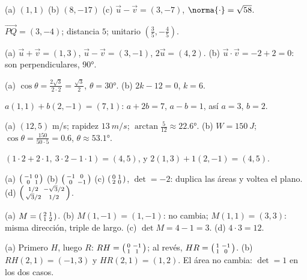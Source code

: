 \documentclass[11pt,a4paper]{article}
\newcommand{\matdos}[4]{\mathchoice{\begin{pmatrix}#1 & #2\\ #3 & #4\end{pmatrix}}{\left(\begin{smallmatrix}#1 & #2\\ #3 & #4\end{smallmatrix}\right)}{\left(\begin{smallmatrix}#1 & #2\\ #3 & #4\end{smallmatrix}\right)}{\left(\begin{smallmatrix}#1 & #2\\ #3 & #4\end{smallmatrix}\right)}}
\begin{document}
\respuestas
\begin{respuestascortas}
\begin{soluciones}
\item (a) $(1,1)$ (b) $(8,-17)$ (c) $\vec u-\vec v=(3,-7)$, $\norma{\cdot}=\sqrt{58}$.
\item $\overrightarrow{PQ}=(3,-4)$; distancia $5$; unitario $\left(\frac35,-\frac45\right)$.
\item (a) $\vec u+\vec v=(1,3)$, $\vec u-\vec v=(3,-1)$, $2\vec u=(4,2)$. (b) $\vec u\cdot\vec v=-2+2=0$: son
  perpendiculares, \ang{90}.
\item (a) $\cos\theta=\frac{2\sqrt3}{2\cdot2}=\frac{\sqrt3}{2}$, $\theta=\ang{30}$. (b) $2k-12=0$, $k=6$.
\item $a(1,1)+b(2,-1)=(7,1)$: $a+2b=7$, $a-b=1$, así $a=3$, $b=2$.
\item (a) $(12,5)$ \si{m/s}; rapidez $\SI{13}{m/s}$; $\arctan\frac{5}{12}\approx\ang{22.6}$.
  (b) $W=\SI{150}{J}$; $\cos\theta=\frac{150}{50\cdot5}=0.6$, $\theta\approx\ang{53.1}$.
\item $(1\cdot2+2\cdot1,\ 3\cdot2-1\cdot1)=(4,5)$, y $2(1,3)+1(2,-1)=(4,5)$.
\item (a) $\matdos{-1}001$ (b) $\matdos{-1}00{-1}$ (c) $\matdos0120$, $\det=-2$: duplica las áreas y voltea el plano.
  (d) $\matdos{1/2}{-\sqrt3/2}{\sqrt3/2}{1/2}$.
\item (a) $M=\matdos2112$. (b) $M(1,-1)=(1,-1)$: no cambia; $M(1,1)=(3,3)$: misma dirección, triple de largo.
  (c) $\det M=4-1=3$. (d) $4\cdot3=12$.
\item (a) Primero $H$, luego $R$: $RH=\matdos0{-1}11$; al revés, $HR=\matdos1{-1}10$.
  (b) $RH(2,1)=(-1,3)$ y $HR(2,1)=(1,2)$. El área no cambia: $\det=1$ en los dos casos.
\end{soluciones}
\end{respuestascortas}
\end{document}
